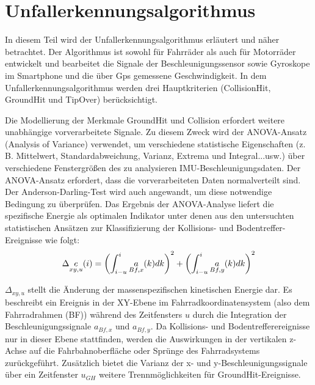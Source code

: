 %
%
%
%
%
%
%
\section{Unfallerkennungsalgorithmus} \label{abs:Unfallerkennungsalgorithmus}
%
%
%
%

In diesem Teil wird der Unfallerkennungsalgorithmus erläutert und näher betrachtet. Der Algorithmus ist sowohl für Fahrräder als auch für Motorräder entwickelt und bearbeitet die Signale der Beschleunigungssensor sowie Gyroskope im Smartphone und die über Gps gemessene Geschwindigkeit. In dem Unfallerkennungsalgorithmus werden drei Hauptkriterien (CollisionHit, GroundHit und TipOver) berücksichtigt.

Die Modellierung der Merkmale GroundHit und Collision erfordert weitere unabhängige vorverarbeitete Signale. Zu diesem Zweck wird der ANOVA-Ansatz (Analysis of Variance) verwendet, um verschiedene statistische Eigenschaften (z. B. Mittelwert, Standardabweichung, Varianz, Extrema und Integral...usw.) über verschiedene Fenstergrößen des zu analysieren IMU-Beschleunigungsdaten. Der ANOVA-Ansatz erfordert, dass die vorverarbeiteten Daten normalverteilt sind. Der Anderson-Darling-Test wird auch angewandt, um diese notwendige Bedingung zu überprüfen. Das Ergebnis der ANOVA-Analyse liefert die spezifische Energie als optimalen Indikator unter denen aus den untersuchten statistischen Ansätzen zur Klassifizierung der Kollisions- und Bodentreffer-Ereignisse wie folgt:
\begin{equation}
	\centering
	\begin{gathered}
		\Delta\underset{xy,u}{e} (i) = \left(\int_{i-u}^{i} \underset{Bf,x}{a}(k) dk \right)^2 + \left(\int_{i-u}^{i} \underset{Bf,y}{a}(k) dk \right)^2
		\label{gl:EnergieFormel_JanPaper}
	\end{gathered}
\end{equation}


$\Delta_{xy,u}$ stellt die Änderung der massenspezifischen kinetischen Energie dar. Es beschreibt ein Ereignis in der XY-Ebene im Fahrradkoordinatensystem (also dem Fahrradrahmen (BF)) während des Zeitfensters $u$ durch die Integration der Beschleunigungssignale $a_{Bf,x}$ und $a_{Bf,y}$. Da Kollisions- und Bodentrefferereignisse nur in dieser Ebene stattfinden, werden die Auswirkungen in der vertikalen z-Achse auf die Fahrbahnoberfläche oder Sprünge des Fahrradsystems zurückgeführt. Zusätzlich bietet die Varianz der x- und y-Beschleunigungssignale über ein Zeitfenster $u_{GH}$ weitere Trennmöglichkeiten für GroundHit-Ereignisse. \citep{Schneeclassification2021}

